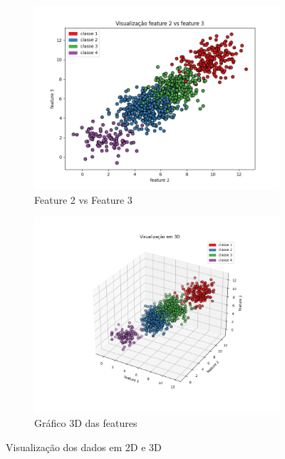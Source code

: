 \begin{enumerate}
\begin{figure}[H]
    \begin{subfigure}{0.45\textwidth}
        \includegraphics[width=\textwidth]{fig/q1_i1_x2x3.png}
        \caption{Feature 2 vs Feature 3}
        \label{fig:q1_i1_x2x3}
    \end{subfigure}
    \hfill
    \begin{subfigure}{0.45\textwidth}
        \includegraphics[width=\textwidth]{fig/q1_i1_3d.png}
        \caption{Gráfico 3D das features}
        \label{fig:q1_i1_3d}
    \end{subfigure}
    
    \caption{Visualização dos dados em 2D e 3D}
    \label{fig:q1_i1_combined}
\end{figure}


\end{enumerate}
